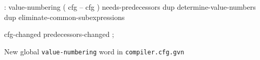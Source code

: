 \centering

  \begin{factorcode}
    : value-numbering ( cfg -- cfg )
        needs-predecessors
        dup determine-value-numbers
        dup eliminate-common-subexpressions

        cfg-changed predecessors-changed ;
  \end{factorcode}

\caption{New global \texttt{value-numbering} word in \texttt{compiler.cfg.gvn}}
